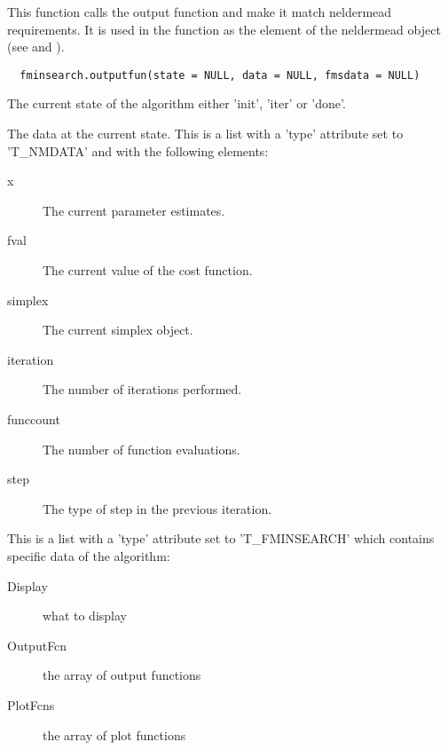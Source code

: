 %
\begin{Description}\relax
This function calls the output function and make it match neldermead
requirements. It is used in the  function as the
 element of the neldermead object (see
 and ).
\end{Description}
%
\begin{Usage}
\begin{verbatim}
  fminsearch.outputfun(state = NULL, data = NULL, fmsdata = NULL)
\end{verbatim}
\end{Usage}
%
\begin{Arguments}
\begin{ldescription}
\item[\code{state}] The current state of the algorithm either 'init', 'iter' or
'done'.
\item[\code{data}] The data at the current state. This is a list with a 'type'
attribute set to 'T\_NMDATA' and  with the following elements:\begin{description}

\item[x] The current parameter estimates.
\item[fval] The current value of the cost function.
\item[simplex] The current simplex object.
\item[iteration] The number of iterations performed.
\item[funccount] The number of function evaluations.
\item[step] The type of step in the previous iteration.

\end{description}


\item[\code{fmsdata}] This is a list with a 'type' attribute set to 'T\_FMINSEARCH'
which contains specific data of the  algorithm: \begin{description}

\item[Display] what to display
\item[OutputFcn] the array of output functions
\item[PlotFcns] the array of plot functions

\end{description}


\end{ldescription}
\end{Arguments}
